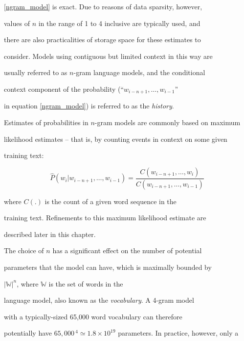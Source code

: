 \ref{ngram_model} is exact.  Due to reasons of data sparsity, however,


values of $n$ in the range of 1 to 4 inclusive are typically used, and


there are also practicalities of storage space for these estimates to


consider.  Models using contiguous but limited context in this way are


usually referred to as $n$-gram language models, and the conditional


context component of the probability (``$w_{i-n+1}, \ldots, w_{i-1}$''


in equation \ref{ngram_model}) is referred to as the {\it history}.





Estimates of probabilities in $n$-gram models are commonly based on maximum


likelihood estimates -- that is, by counting events in context on some given


training text:


\begin{equation}


\hat P(w_i | w_{i-n+1}, \ldots, w_{i-1}) =


\frac{C(w_{i-n+1}, \ldots, w_i)}{C(w_{i-n+1}, \ldots, w_{i-1})}\label{ngramcountdiv}


\end{equation}


where $C(.)$ is the count of a given word sequence in the


training text. Refinements to this maximum likelihood estimate are


described later in this chapter.





The choice of $n$ has a significant effect on the number of potential


parameters that the model can have, which is maximally bounded by


$|\mathbb{W}|^n$, where $\mathbb{W}$ is the set of words in the


language model, also known as the {\it vocabulary}.  A 4-gram model


with a typically-sized 65,000 word vocabulary can therefore


potentially have $65,000\,^4


\simeq 1.8\times10^{19}$ parameters.  In practice, however, only a


